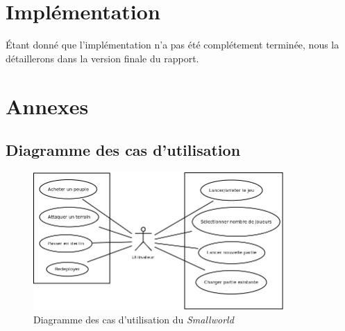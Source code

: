 \documentclass[a4paper]{report}
\begin{document}
\chapter{Implémentation}
Étant donné que l'implémentation n'a pas été complétement terminée, nous la détaillerons dans la version finale du rapport.
\newpage
\chapter{Annexes}
\section{Diagramme des cas d'utilisation}
\begin{figure}[H]
    \begin{center}
        \includegraphics[width=0.85\textwidth]{use_case.png}
        \caption{Diagramme des cas d'utilisation du \textit{Smallworld}}
    \end{center}
\end{figure}
\end{document}
